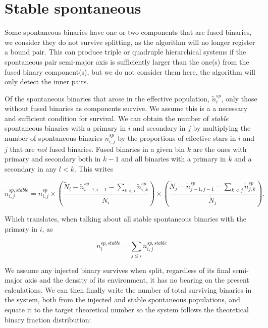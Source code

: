 \section{Stable spontaneous}

Some spontaneous binaries have one or two components that are fused binaries, we consider they do not survive splitting, as the algorithm will no longer register a bound pair. This can produce triple or quadruple hierarchical  systems if the spontaneous pair semi-major axis is sufficiently larger than the one(s) from the fused binary component(s), but we do not consider them here, the algorithm will only detect the inner pairs.

Of the spontaneous binaries that arose in the effective population,  $\tilde{n}_i^{sp}$, only those without fused binaries as components survive. We assume this is a a necessary and sufficient condition for survival. We can obtain the number of \textit{stable} spontaneous binaries with a primary in $i$ and secondary in $j$ by multiplying the number of spontaneous binaries $\tilde{n}_{i,j}^{sp}$ by the proportions of effective stars in $i$ and $j$ that are \textit{not} fused binaries. Fused binaries in a given bin $k$ are the ones with primary and secondary both in $k-1$ and all binaries with a primary in $k$ and a secondary in any $l<k$. This writes

\begin{equation}
\tilde{n}_{i,j}^{sp,stable} = \tilde{n}_{i,j}^{sp}  	 \times
\left( \frac{	\tilde{N}_i -
				\tilde{n}_{i-1,i-1}^{sp} - 
				\sum\limits_{k<i} \tilde{n}_{i,k}^{sp} }{\tilde{N}_i } \right) \times
\left( \frac{ 	\tilde{N}_j -
				\tilde{n}_{j-1,j-1}^{sp} - 
				\sum\limits_{k<j} \tilde{n}_{j,k}^{sp} }{\tilde{N}_j } \right).
\end{equation}

Which translates, when talking about all stable spontaneous binaries with the primary in $i$, as

\begin{equation}
\tilde{n}_{i}^{sp,stable} = \sum\limits_{j\le i} \tilde{n}_{i,j}^{sp,stable}  
\end{equation}


We assume any injected binary survives when split, regardless of its final semi-major axis and the density of its environment, it has no bearing on the present calculations. We can then finally write the number of total surviving binaries in the system, both from the injected and stable spontaneous populations, and equate it to the target theoretical number so the system follows the theoretical binary fraction distribution:


